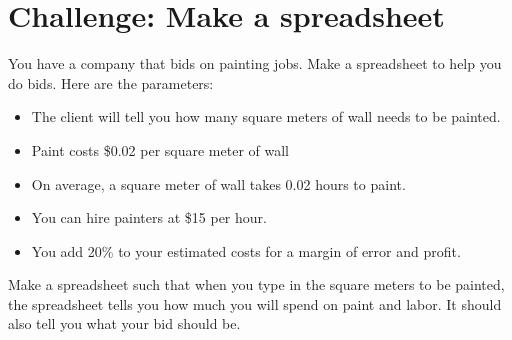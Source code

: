 \section{Challenge: Make a spreadsheet}

You have a company that bids on painting jobs. Make a
spreadsheet to help you do bids. Here are the parameters:
\begin{itemize}
\item The client will tell you how many square meters of wall needs to be painted.
\item Paint costs \$0.02 per square meter of wall
\item On average, a square meter of wall takes 0.02 hours to paint.
\item You can hire painters at \$15 per hour.
\item You add 20\% to your estimated costs for a margin of error and profit.
\end{itemize}

Make a spreadsheet such that when you type in the square meters to be
painted, the spreadsheet tells you how much you will spend on paint
and labor.  It should also tell you what your bid should be.
